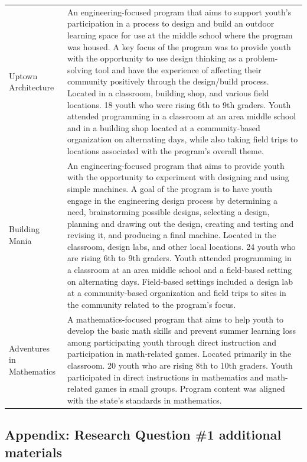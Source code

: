 \documentclass[]{msu-thesis}
\theoremstyle{definition}
\theoremstyle{definition}
\theoremstyle{definition}
\theoremstyle{remark}
\begin{document}
\begin{landscape}
\begin{table}
\begin{tabular}[t]{ll}
Uptown Architecture & An engineering-focused program that aims to support youth's participation in a process to design and build an outdoor learning space for use at the middle school where the program was housed. A key focus of the program was to provide youth with the opportunity to use design thinking as a problem-solving tool and have the experience of affecting their community positively through the design/build process. Located in a classroom, building shop, and various field locations. 18 youth who were rising 6th to 9th graders. Youth attended programming in a classroom at an area middle school and in a building shop located at a community-based organization on alternating days, while also taking field trips to locations associated with the program's overall theme.\\
Building Mania & An engineering-focused program that aims to provide youth with the opportunity to experiment with designing and using simple machines. A goal of the program is to have youth engage in the engineering design process by determining a need, brainstorming possible designs, selecting a design, planning and drawing out the design, creating and testing and revising it, and producing a final machine. Located in the classroom, design labs, and other local locations. 24 youth who are rising 6th to 9th graders. Youth attended programming in a classroom at an area middle school and a field-based setting on alternating days. Field-based settings included a design lab at a community-based organization and field trips to sites in the community related to the program's focus.\\
Adventures in Mathematics & A mathematics-focused program that aims to help youth to develop the basic math skills and prevent summer learning loss among participating youth through direct instruction and participation in math-related games. Located primarily in the classroom. 20 youth who are rising 8th to 10th graders. Youth participated in direct instructions in mathematics and math-related games in small groups. Program content was aligned with the state's standards in mathematics.\\
\bottomrule
\end{tabular}
\end{table}
\end{landscape}

\subsection{Appendix: Research Question \#1 additional
materials}\label{appendix-research-question-1-additional-materials}
\end{document}
